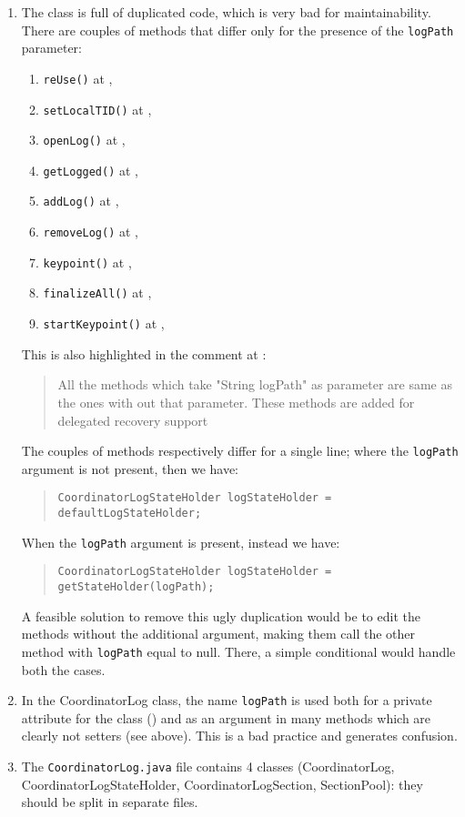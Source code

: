 \begin{enumerate}
    \item {} The class is full of duplicated code, which is very bad for maintainability. There are couples of methods that differ only for the presence of the \texttt{logPath} parameter:
    \begin{enumerate}
        \item \texttt{reUse()} at , 
    	\item \texttt{setLocalTID()} at , 
    	\item \texttt{openLog()} at , 
    	\item \texttt{getLogged()} at , 
    	\item \texttt{addLog()} at , 
    	\item \texttt{removeLog()} at , 
    	\item \texttt{keypoint()} at , 
    	\item \texttt{finalizeAll()} at , 
    	\item \texttt{startKeypoint()} at , 
    \end{enumerate}
    This is also highlighted in the comment at :
    \begin{quote}
        All the methods which take "String logPath" as parameter are same as the ones with out that parameter. These methods are added for delegated recovery support
    \end{quote}
    The couples of methods respectively differ for a single line; where the \texttt{logPath} argument is not present, then we have:
    \begin{quote}
        \small\texttt{CoordinatorLogStateHolder logStateHolder = defaultLogStateHolder;}
    \end{quote}
    When the \texttt{logPath} argument is present, instead we have:
    \begin{quote}
        \small\texttt{CoordinatorLogStateHolder logStateHolder = getStateHolder(logPath);}
    \end{quote}
    A feasible solution to remove this ugly duplication would be to edit the methods without the additional argument, making them call the other method with \texttt{logPath} equal to null. There, a simple conditional would handle both the cases.

    \item In the CoordinatorLog class, the name \texttt{logPath} is used both for a private attribute for the class () and as an argument in many methods which are clearly not setters (see above). This is a bad practice and generates confusion.
    \item The \texttt{CoordinatorLog.java} file contains 4 classes (CoordinatorLog, CoordinatorLogStateHolder, CoordinatorLogSection, SectionPool): they should be split in separate files.
\end{enumerate}
